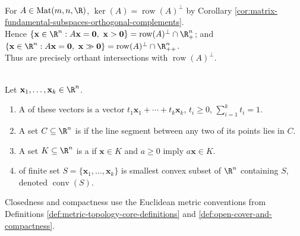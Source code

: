 \begin{principle} \label{pri:positive-system-row-space-view} \\
For $A\in\operatorname{Mat}(m,n,\R)$, $\ker(A)=\operatorname{row}(A)^\perp$ by Corollary \ref{cor:matrix-fundamental-subspaces-orthogonal-complements}.\\
Hence $\{\mathbf{x}\in\R^n:A\mathbf{x}=\mathbf{0},\ \mathbf{x}>\mathbf{0}\} =\operatorname{row}(A)^\perp\cap\R_+^n$; and $\{\mathbf{x}\in\R^n:A\mathbf{x}=\mathbf{0},\ \mathbf{x}\gg\mathbf{0}\} =\operatorname{row}(A)^\perp\cap\R_{++}^n$.\\
Thus  are precisely orthant intersections with $\operatorname{row}(A)^\perp$.
\end{principle}

\begin{definition} \label{def:convex-combinations-cones-hulls} \\
Let $\mathbf{x}_1,\ldots,\mathbf{x}_k\in\R^n$.
\begin{enumerate}[label=\roman*.]
\setlength{\itemsep}{0pt}
\item A  of these vectors is a vector $t_1\mathbf{x}_1+\cdots+t_k\mathbf{x}_k$, $t_i\geq0$, $\sum\limits_{i=1}^k t_i=1$.
\item A set $C\subseteq\R^n$ is  if the line segment between any two of its points lies in $C$.
\item A set $K\subseteq\R^n$ is a  if $\mathbf{x}\in K$ and $a\geq0$ imply $a\mathbf{x}\in K$.
\item {} of finite set $S=\{\mathbf{x}_1,\ldots,\mathbf{x}_k\}$ is smallest convex subset of $\R^n$ containing $S$, denoted $\operatorname{conv}(S)$.
\end{enumerate}
Closedness and compactness use the Euclidean metric conventions from Definitions \ref{def:metric-topology-core-definitions} and \ref{def:open-cover-and-compactness}.
\end{definition}


